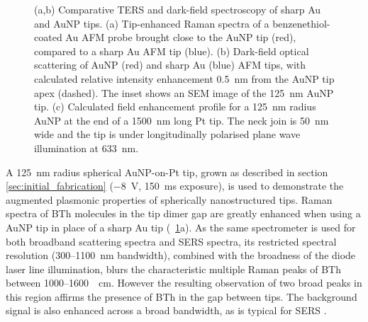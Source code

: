 \documentclass{article}
\begin{document}
\begin{figure}[bt]
{%
(a,b) Comparative TERS and dark-field spectroscopy of sharp Au and AuNP tips. (a) Tip-enhanced Raman spectra of a benzenethiol-coated Au AFM probe brought close to the AuNP tip (red), compared to a sharp Au AFM tip (blue). (b) Dark-field optical scattering of AuNP (red) and sharp Au (blue) AFM tips, with calculated relative intensity enhancement \SI{0.5}{nm} from the AuNP tip apex (dashed). The inset shows an SEM image of the \SI{125}{nm} AuNP tip. %
(c) Calculated field enhancement profile for a \SI{125}{nm} radius AuNP at the end of a \SI{1500}{nm} long Pt tip. The neck join is \SI{50}{nm} wide and the tip is under longitudinally polarised plane wave illumination at \SI{633}{nm}.}
\label{fig:ters_comparison}
\end{figure}


A \SI{125}{nm} radius spherical AuNP-on-Pt tip, grown as described in section \ref{sec:initial_fabrication} (\SI{-8}{V}, \SI{150}{ms} exposure), is used to demonstrate the augmented plasmonic properties of spherically nanostructured tips. Raman spectra of BTh molecules in the tip dimer gap are greatly enhanced when using a AuNP tip in place of a sharp Au tip (\figurename~\ref{fig:ters_comparison}a). As the same spectrometer is used for both broadband scattering spectra and SERS spectra, its restricted spectral resolution (300--\SI{1100}{nm} bandwidth), combined with the broadness of the diode laser line illumination, blurs the characteristic multiple Raman peaks of BTh between 1000--\SI{1600}{\per\centi\metre}. However the resulting observation of two broad peaks in this region affirms the presence of BTh in the gap between tips. The background signal is also enhanced across a broad bandwidth, as is typical for SERS \cite{mahajan2009}.
\end{document}
